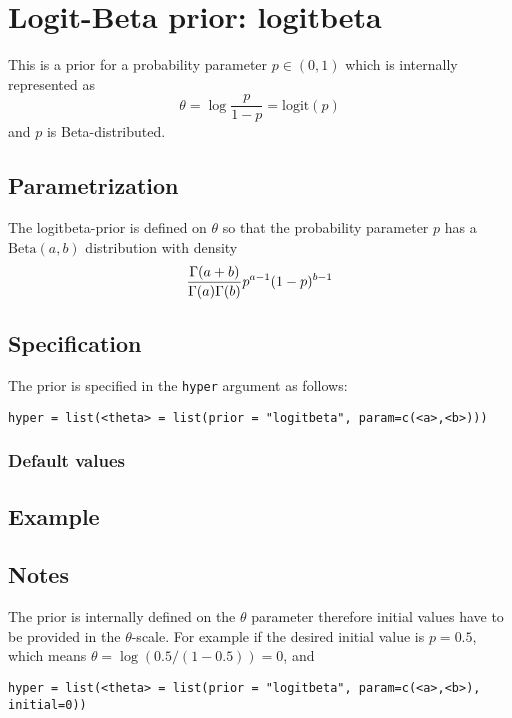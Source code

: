 \documentclass[a4paper,11pt]{article}
\begin{document}
\section*{Logit-Beta prior: logitbeta}

This is a prior for a probability parameter $p\in(0,1)$ which is
internally represented as
\[
\theta = \log\frac{p}{1-p}  = \text{logit}(p)
\]
and $p$ is Beta-distributed. 

\subsection*{Parametrization}

The logitbeta-prior is defined on $\theta$ so that the probability parameter $p$
has a $\text{Beta}(a,b)$ distribution with density
\begin{displaymath}
   {\Gamma(a+b) \over \Gamma(a) \Gamma(b)} p^{a-1} (1-p)^{b-1} 
\end{displaymath}

\subsection*{Specification}

The prior is specified in the {\tt hyper} argument as follows:
\begin{center}
    {\tt hyper = list(<theta> = list(prior = "logitbeta", param=c(<a>,<b>)))}
\end{center}

\subsubsection*{Default values}


\subsection*{Example}

\subsection*{Notes}

The prior is internally defined on the $\theta$ parameter therefore
initial values have to be provided in the $\theta$-scale. For example
if the desired initial value is $p=0.5$, which means
$\theta=\log(0.5 / (1-0.5))=0$, and 
\begin{center}
    {\tt hyper = list(<theta> = list(prior = "logitbeta",
        param=c(<a>,<b>), initial=0))}
\end{center}
\end{document}
